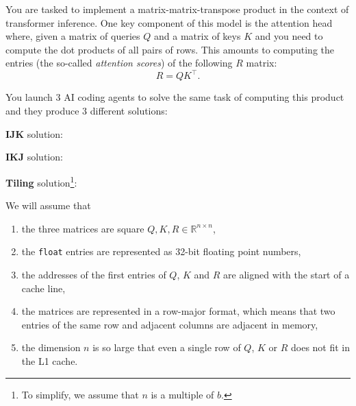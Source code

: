 \question{}

You are tasked to implement a matrix-matrix-transpose product in the context of transformer inference.
One key component of this model is the attention head where, given a matrix of queries $Q$ and a matrix of keys $K$ and you need to compute the dot products of all pairs of rows.
This amounts to computing the entries (the so-called \emph{attention scores}) of the following $R$ matrix:
\[ R = QK^\top. \]

You launch 3 AI coding agents to solve the same task of computing this product and they produce 3 different solutions:

\noindent\textbf{IJK} solution:


\noindent\textbf{IKJ} solution:


\noindent\textbf{Tiling} solution\footnote{To simplify, we assume that $n$ is a multiple of $b$.}:


We will assume that
\begin{enumerate}
\item the three matrices are square $Q, K, R \in \mathbb{R}^{n \times n}$,
\item the \lstinline|float| entries are represented as 32-bit floating point numbers,
\item the addresses of the first entries of $Q$, $K$ and $R$ are aligned with the start of a cache line,
\item the matrices are represented in a row-major format, which means that two entries of the same row and adjacent columns are adjacent in memory,
\item the dimension $n$ is so large that even a single row of $Q$, $K$ or $R$ does not fit in the L1 cache.
\end{enumerate}

